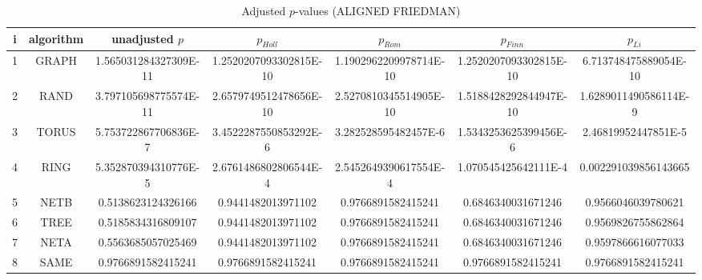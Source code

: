 \documentclass[a4paper,10pt]{article}
\begin{document}
\begin{landscape}
\begin{table}[!htp]
\centering\scriptsize
\caption{Adjusted $p$-values (ALIGNED FRIEDMAN)}
\begin{tabular}{ccccccc}
i&algorithm&unadjusted $p$&$p_{Holl}$&$p_{Rom}$&$p_{Finn}$&$p_{Li}$\\
\hline
1& GRAPH&1.565031284327309E-11&1.2520207093302815E-10&1.1902962209978714E-10&1.2520207093302815E-10&6.713748475889054E-10\\
2& RAND&3.797105698775574E-11&2.6579749512478656E-10&2.5270810345514905E-10&1.5188428292844947E-10&1.6289011490586114E-9\\
3& TORUS&5.753722867706836E-7&3.4522287550853292E-6&3.282528595482457E-6&1.5343253625399456E-6&2.46819952447851E-5\\
4& RING&5.352870394310776E-5&2.6761486802806544E-4&2.5452649390617554E-4&1.070545425642111E-4&0.002291039856143665\\
5& NETB&0.5138623124326166&0.9441482013971102&0.9766891582415241&0.6846340031671246&0.9566046039780621\\
6& TREE&0.5185834316809107&0.9441482013971102&0.9766891582415241&0.6846340031671246&0.9569826755862864\\
7& NETA&0.5563685057025469&0.9441482013971102&0.9766891582415241&0.6846340031671246&0.9597866616077033\\
8& SAME&0.9766891582415241&0.9766891582415241&0.9766891582415241&0.9766891582415241&0.9766891582415241\\
\hline
\end{tabular}
\end{table}


\newpage


\end{landscape}
\end{document}
